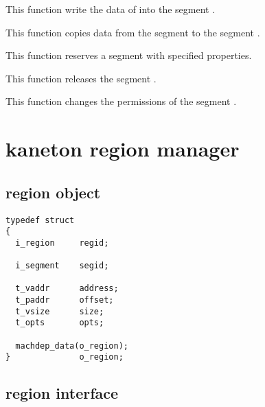 	 {
	   This function write the data of  into the
	   segment .
	 }

	 {
	   This function copies data from the segment  to
	   the segment .
	 }

	 {
	   This function reserves a segment with specified properties.
	 }

	 {
	   This function releases the segment .
	 }

	 {
	   This function changes the permissions of the segment .
	 }

\section*{kaneton region manager}

\subsection*{region object}

\begin{verbatim}
typedef struct
{
  i_region     regid;

  i_segment    segid;

  t_vaddr      address;
  t_paddr      offset;
  t_vsize      size;
  t_opts       opts;

  machdep_data(o_region);
}              o_region;
\end{verbatim}

\subsection*{region interface}

